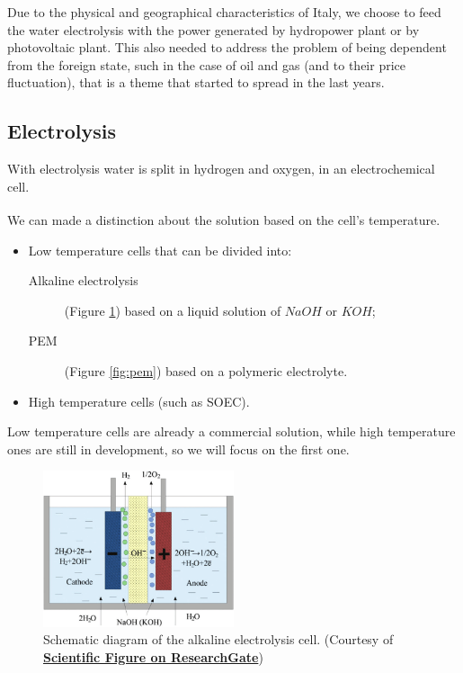 Due to the physical and geographical characteristics of Italy, we choose to feed the water electrolysis with the power generated by hydropower plant or by photovoltaic plant. This also needed to address the problem of being dependent from the foreign state, such in the case of oil and gas (and to their price fluctuation), that is a theme that started to spread in the last years.

\subsection{Electrolysis}
With electrolysis water is split in hydrogen and oxygen, in an electrochemical cell.

We can made a distinction about the solution based on the cell's temperature\textsuperscript{\cite{guanda20211}}.
\begin{itemize}
    \item Low temperature cells that can be divided into:
    \begin{description}
        \item[Alkaline electrolysis](Figure \ref{fig:alkaline})  based on a liquid solution of $NaOH$ or $KOH$;
        \item[PEM] (Figure \ref{fig:pem}) based on a polymeric electrolyte.
    \end{description}
    \item High temperature cells (such as SOEC).
\end{itemize}

Low temperature cells are already a commercial solution, while high temperature ones are still in development, so we will focus on the first one.

\begin{figure}[hp]
    \centering
    \includegraphics[width=0.5\textwidth]{Chapters/Pictures/Schematic-diagram-of-the-alkaline-electrolysis-cell-34.png}
    \caption{Schematic diagram of the alkaline electrolysis cell.
    (Courtesy of \textbf{\href{https://www.researchgate.net/figure/Schematic-diagram-of-the-alkaline-electrolysis-cell-34_fig4_327179309}{Scientific Figure on ResearchGate}})}
    \label{fig:alkaline}
\end{figure}

